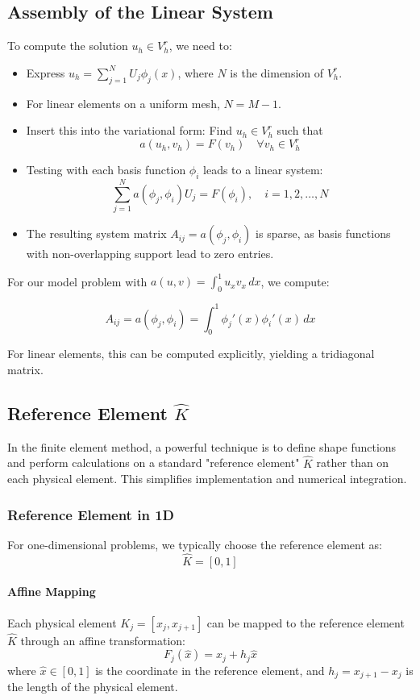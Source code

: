 \subsection{Assembly of the Linear System}
To compute the solution $u_h \in V_h^r$, we need to:

\begin{itemize}
  \item Express $u_h = \sum_{j=1}^N U_j \phi_j(x)$, where $N$ is the dimension of $V_h^r$.
  \item For linear elements on a uniform mesh, $N = M-1$.
  \item Insert this into the variational form: Find $u_h \in V_h^r$ such that
        \[
          a(u_h, v_h) = F(v_h) \quad \forall v_h \in V_h^r
        \]
  \item Testing with each basis function $\phi_i$ leads to a linear system:
        \[
          \sum_{j=1}^N a(\phi_j, \phi_i) U_j = F(\phi_i), \quad i = 1,2,\ldots,N
        \]
  \item The resulting system matrix $A_{ij} = a(\phi_j, \phi_i)$ is sparse, as basis functions with non-overlapping support lead to zero entries.
\end{itemize}

For our model problem with $a(u,v) = \int_0^1 u_x v_x \, dx$, we compute:

\[
  A_{ij} = a(\phi_j, \phi_i) = \int_0^1 \phi_j'(x) \phi_i'(x) \, dx
\]

For linear elements, this can be computed explicitly, yielding a tridiagonal matrix.

\subsection{Reference Element \texorpdfstring{$\hat{K}$}{K}}

In the finite element method, a powerful technique is to define shape functions and perform calculations on a standard "reference element" $\hat{K}$ rather than on each physical element. This simplifies implementation and numerical integration.

\subsubsection{Reference Element in 1D}
For one-dimensional problems, we typically choose the reference element as:
\[
  \hat{K} = [0,1]
\]

\paragraph{Affine Mapping}
Each physical element $K_j = [x_j, x_{j+1}]$ can be mapped to the reference element $\hat{K}$ through an affine transformation:
\[
  F_j(\hat{x}) = x_j + h_j\hat{x}
\]
where $\hat{x} \in [0,1]$ is the coordinate in the reference element, and $h_j = x_{j+1} - x_j$ is the length of the physical element.

